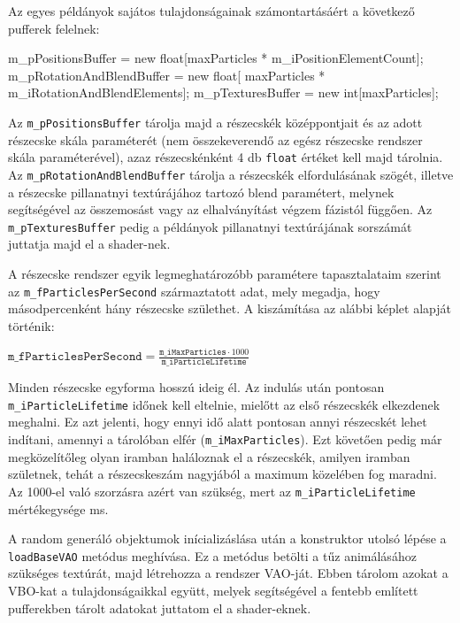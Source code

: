 Az egyes példányok sajátos tulajdonságainak számontartásáért a következő pufferek felelnek:
\begin{cpp}
m_pPositionsBuffer = new float[maxParticles * m_iPositionElementCount];
m_pRotationAndBlendBuffer = new float[
			maxParticles * m_iRotationAndBlendElements];
m_pTexturesBuffer = new int[maxParticles];
\end{cpp}
Az \texttt{m\_pPositionsBuffer} tárolja majd a részecskék középpontjait és az adott részecske skála paraméterét (nem összekeverendő az egész részecske rendszer skála paraméterével), azaz részecskénként 4 db \texttt{float} értéket kell majd tárolnia. Az \texttt{m\_pRotationAndBlendBuffer} tárolja a részecskék elfordulásának szögét, illetve a részecske pillanatnyi textúrájához tartozó blend paramétert, melynek segítségével az összemosást vagy az elhalványítást végzem fázistól függően. Az \texttt{m\_pTexturesBuffer} pedig a példányok pillanatnyi textúrájának sorszámát juttatja majd el a shader-nek.

A részecske rendszer egyik legmeghatározóbb paramétere tapasztalataim szerint az \texttt{m\_fParticlesPerSecond} származtatott adat, mely megadja, hogy másodpercenként hány részecske születhet. A kiszámítása az alábbi képlet alapját történik:

\begingroup
\Large
\begin{center}
$ \texttt{m\_fParticlesPerSecond} = \frac{\texttt{m\_iMaxParticles} \cdot 1000}{\texttt{m\_iParticleLifetime}}$
\end{center}
\endgroup
Minden részecske egyforma hosszú ideig él. Az indulás után pontosan \texttt{m\_iParticleLifetime} időnek kell eltelnie, mielőtt az első részecskék elkezdenek meghalni. Ez azt jelenti, hogy ennyi idő alatt pontosan annyi részecskét lehet indítani, amennyi a tárolóban elfér (\texttt{m\_iMaxParticles}). Ezt követően pedig már megközelítőleg olyan iramban haláloznak el a részecskék, amilyen iramban születnek, tehát a részecskeszám nagyjából a maximum közelében fog maradni. Az 1000-el való szorzásra azért van szükség, mert az \texttt{m\_iParticleLifetime} mértékegysége ms.

A random generáló objektumok inícializáslása után a konstruktor utolsó lépése a \texttt{loadBaseVAO} metódus meghívása. Ez a metódus betölti a tűz animálásához szükséges textúrát, majd létrehozza a rendszer VAO-ját. Ebben tárolom azokat a VBO-kat a tulajdonságaikkal együtt, melyek segítségével a fentebb említett pufferekben tárolt adatokat juttatom el a shader-eknek. 

